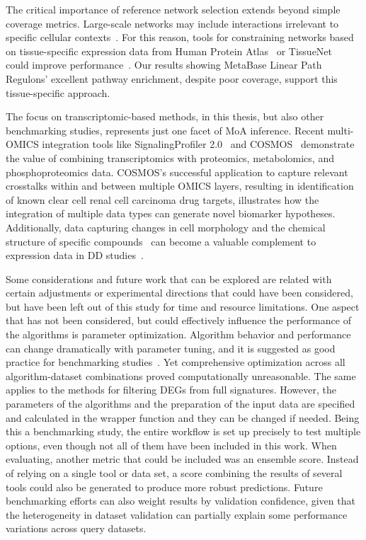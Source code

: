 The critical importance of reference network selection extends beyond simple coverage metrics. 
Large-scale networks may include interactions irrelevant to specific cellular contexts~\cite{RN38}. 
For this reason, tools for constraining networks based on tissue-specific expression data from Human Protein Atlas~\cite{RN166} or TissueNet~\cite{RN137} could improve performance~\cite{RN38}. 
Our results showing MetaBase Linear Path Regulons' excellent pathway enrichment, despite poor coverage, support this tissue-specific approach.

The focus on transcriptomic-based methods, in this thesis, but also other benchmarking studies, represents just one facet of \gls{MoA} inference. 
Recent multi-OMICS integration tools like SignalingProfiler 2.0~\cite{RN100} and COSMOS~\cite{RN99} demonstrate the value of combining transcriptomics with proteomics, metabolomics, and phosphoproteomics data. 
COSMOS's successful application to capture relevant crosstalks within and between multiple OMICS layers, resulting in identification of known clear cell renal cell carcinoma drug targets, illustrates how the integration of multiple data types can generate novel biomarker hypotheses. 
Additionally, data capturing changes in cell morphology and the chemical structure of specific compounds~\cite{RN167} can become a valuable complement to expression data in \gls{DD} studies~\cite{RN38}. 

Some considerations and future work that can be explored are related with certain adjustments or experimental directions that could have been considered, but have been left out of this study for time and resource limitations. 
One aspect that has not been considered, but could effectively influence the performance of the algorithms is parameter optimization. 
Algorithm behavior and performance can change dramatically with parameter tuning, and it is suggested as good practice for benchmarking studies~\cite{RN108}. 
Yet comprehensive optimization across all algorithm-dataset combinations proved computationally unreasonable. 
The same applies to the methods for filtering \gls{DEGs} from full signatures. 
However, the parameters of the algorithms and the preparation of the input data are specified and calculated in the wrapper function and they can be changed if needed. 
Being this a benchmarking study, the entire workflow is set up precisely to test multiple options, even though not all of them have been included in this work. 
When evaluating, another metric that could be included was an ensemble score. 
Instead of relying on a single tool or data set, a score combining the results of several tools could also be generated to produce more robust predictions. 
Future benchmarking efforts can also weight results by validation confidence, given that the heterogeneity in dataset validation can partially explain some performance variations across query datasets.

